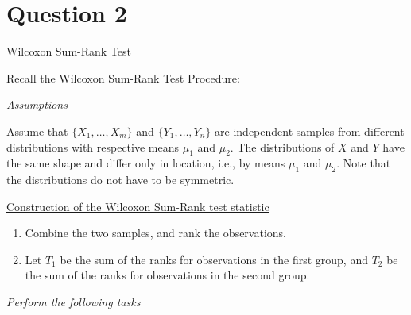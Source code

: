 \documentclass[letterpaper]{article}
\begin{document}
		\clearpage
		
		\section{Question 2}
		{\color{deepred} Wilcoxon Sum-Rank Test}
		
		\medskip
		
		Recall the Wilcoxon Sum-Rank Test Procedure:
		
		\medskip
		
		\emph{Assumptions}
		
		\medskip
		
		Assume that $\{X_1,\dots,X_m\}$ and $\{Y_1,\dots,Y_n\}$ are independent samples from different distributions with respective means $\mu_1$ and $\mu_2$. The distributions of $X$ and $Y$ have the same shape and differ only in location, i.e., by means $\mu_1$ and $\mu_2$. Note that the distributions do not have to be symmetric.
		
		\medskip
		
		\underline{Construction of the Wilcoxon Sum-Rank test statistic}
		
		\begin{enumerate}
			\item[a] Combine the two samples, and rank the observations.
			
			\item[b] Let $T_1$ be the sum of the ranks for observations in the first group, and $T_2$ be the sum of the ranks for observations in the second group.
		\end{enumerate}
		
		\medskip
		
		\emph{Perform the following tasks}
		
\end{document}
